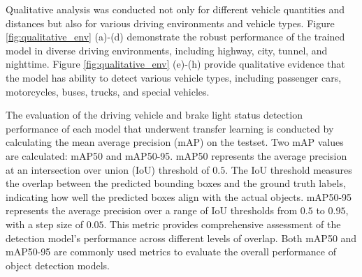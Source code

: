 Qualitative analysis was conducted not only for different vehicle quantities and distances but also for various driving environments and vehicle types.
Figure \ref{fig:qualitative_env} (a)-(d) demonstrate the robust performance of the trained model in diverse driving environments, including highway, city, tunnel, and nighttime.
Figure \ref{fig:qualitative_env} (e)-(h) provide qualitative evidence that the model has ability to detect various vehicle types, including passenger cars, motorcycles, buses, trucks, and special vehicles.

The evaluation of the driving vehicle and brake light status detection performance of each model that underwent transfer learning is conducted by calculating the mean average precision (mAP) on the testset.
Two mAP values are calculated: mAP50 and mAP50-95.
mAP50 represents the average precision at an intersection over union (IoU) threshold of $0.5$. The IoU threshold measures the overlap between the predicted bounding boxes and the ground truth labels, indicating how well the predicted boxes align with the actual objects.
mAP50-95 represents the average precision over a range of IoU thresholds from $0.5$ to $0.95$, with a step size of $0.05$. 
This metric provides comprehensive assessment of the detection model's performance across different levels of overlap.
Both mAP50 and mAP50-95 are commonly used metrics to evaluate the overall performance of object detection models.

